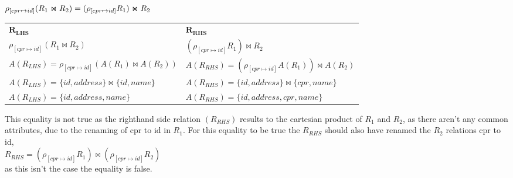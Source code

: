 $\rho_{[cpr\mapsto id]}(R_1 \Join R_2) = (\rho_{[cpr\mapsto id]} R_1) \Join R_2\\$

\begin{table}[h]
\begin{tabular}{ll}
 $\bm{R_{LHS}}$ & $\bm{R_{RHS}}$  \\
 $\rho_{[cpr\mapsto id]}(R_1 \Join R_2)$ & $(\rho_{[cpr\mapsto id]} R_1) \Join R_2$  \\
 $A(R_{LHS}) = \rho_{[cpr\mapsto id]}(A(R_1) \Join A(R_2))$ & $A(R_{RHS}) = (\rho_{[cpr\mapsto id]}A(R_1)) \Join A(R_2)$  \\
 $A(R_{LHS}) = \{id, address\} \Join \{id, name\}$ & $A(R_{RHS}) = \{id, address\} \Join \{cpr, name\}$  \\
 $A(R_{LHS}) = \{id, address, name\}$ & $A(R_{RHS}) = \{id, address, cpr, name\}$
\end{tabular}
\end{table}

This equality is not true as the righthand side relation $(R_{RHS})$ results to the cartesian product of $R_1$ and $R_2$, as there aren't any common attributes, due to the renaming of cpr to id in $R_1$.
For this equality to be true the $R_{RHS}$ should also have renamed the $R_2$ relations cpr to id,\\
$R_{RHS} = (\rho_{[cpr\mapsto id]} R_1) \Join (\rho_{[cpr\mapsto id]} R_2)$\\
as this isn't the case the equality is false.